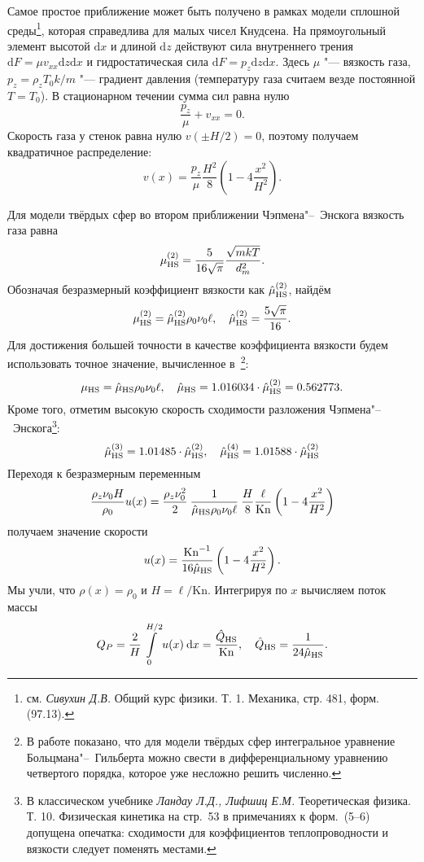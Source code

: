 \documentclass[english,russian,a4paper,12pt]{article}
\newcommand{\dd}{\:\mathrm{d}}
\newcommand{\D}{\mathrm{d}}
\newcommand{\Kn}{\mathrm{Kn}}
\newcommand{\muHS}{\hat{\mu}_{\rm{HS}}}
\newcommand{\QHS}{\hat{Q}_{\rm{HS}}}
\begin{document}
Самое простое приближение может быть получено в рамках модели сплошной среды\footnote
{
	см. \textit{Сивухин Д.В.} Общий курс физики. Т. 1. Механика, стр. 481, форм. (97.13).
},
которая справедлива для малых чисел Кнудсена.
На прямоугольный элемент высотой \(\D x\) и длиной \(\D z\) действуют сила внутреннего трения
\(\D F = \mu v_{xx} \D z \D x \) и гидростатическая сила \(\D F = p_z \D z \D x \).
Здесь \(\mu\) "--- вязкость газа, \(p_z = \rho_z T_0 k/m\) "--- градиент давления (температуру газа считаем везде постоянной \(T=T_0\)).
В стационарном течении сумма сил равна нулю
\begin{equation}\label{eq:forces}
	\frac{p_z}{\mu} + v_{xx} = 0. 
\end{equation}
Скорость газа у стенок равна нулю \(v(\pm H/2) = 0\), поэтому получаем квадратичное распределение:
\[ v(x) = \frac{p_z}{\mu}\frac{H^2}{8}\left(1-4\frac{x^2}{H^2}\right). \]

Для модели твёрдых сфер во втором приближении Чэпмена"--~Энскога вязкость газа равна~\cite{Chapman1991}
\[ \mu_{\rm{HS}}^{(2)} = \frac{5}{16\sqrt\pi}\frac{\sqrt{mkT}}{d_m^2}. \]
Обозначая безразмерный коэффициент вязкости как \(\muHS^{(2)}\), найдём
\[ \mu_{\rm{HS}}^{(2)} = \muHS^{(2)}\rho_0\nu_0\ell, \quad \muHS^{(2)} = \frac{5\sqrt{\pi}}{16}. \]
Для достижения большей точности в качестве коэффициента вязкости будем использовать точное значение,
вычисленное в~\cite{Pekeris1957}\footnote{
	В работе показано, что для модели твёрдых сфер интегральное уравнение Больцмана"--~Гильберта
	можно свести в дифференциальному уравнению четвертого порядка, которое уже несложно решить численно.
}:
\begin{equation}\label{eq:eta_hs}
	\mu_{\rm{HS}} = \muHS\rho_0\nu_0\ell, \quad \muHS = 1.016034\cdot\muHS^{(2)} = 0.562773.
\end{equation}
Кроме того, отметим высокую скорость сходимости разложения Чэпмена"--~Энскога\footnote
{
	В классическом учебнике \textit{Ландау Л.Д., Лифшиц Е.М.} Теоретическая физика. Т. 10. Физическая кинетика
	на стр.~53 в примечаниях к форм.~(5--6) допущена опечатка:
	сходимости для коэффициентов теплопроводности и вязкости следует поменять местами.
}:
\[ \muHS^{(3)} = 1.01485\cdot\muHS^{(2)}, \quad \muHS^{(4)} = 1.01588\cdot\muHS^{(2)} \]
Переходя к безразмерным переменным
\[
	\frac{\rho_z \nu_0 H}{\rho_0}u(x) = \frac{\rho_z\nu_0^2}{2}\:
	\frac1{\muHS\rho_0\nu_0\ell}\:\frac{H}{8}\frac{\ell}{\Kn}
	\left(1-4\frac{x^2}{H^2}\right)
\]
получаем значение скорости
\[ u(x) = \frac{\Kn^{-1}}{16\muHS} \left(1-4\frac{x^2}{H^2}\right). \]
Мы учли, что \(\rho(x)=\rho_0\) и \(H=\ell/\Kn\).
Интегрируя по \(x\) вычисляем поток массы
\[ Q_P = \frac2{H}\int\limits_{0}^{H/2} u(x) \dd x = \frac{\QHS}{\Kn}, \quad \QHS = \frac1{24\muHS}. \]
\end{document}
